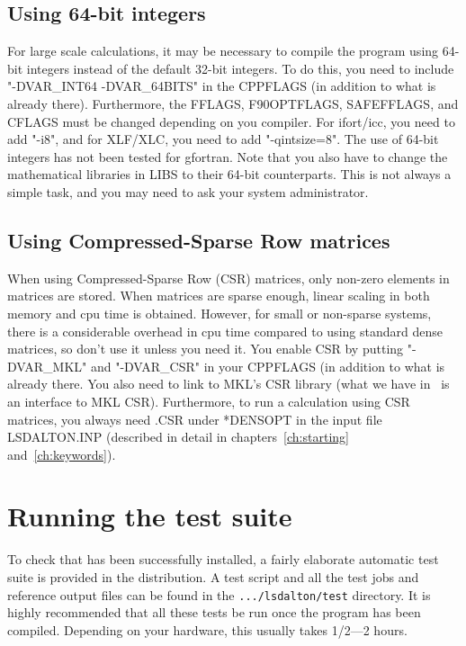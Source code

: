 \subsection{Using 64-bit integers}
For large scale calculations, it may be necessary to compile the program using 64-bit integers instead of the default 32-bit integers.
To do this, you need to include "-DVAR\_INT64 -DVAR\_64BITS" in the CPPFLAGS (in addition to what is already there). Furthermore, 
the FFLAGS, F90OPTFLAGS, SAFEFFLAGS, and CFLAGS must be changed depending on you compiler. For ifort/icc, you need to add "-i8",
and for XLF/XLC, you need to add "-qintsize=8". The use of 64-bit integers has not been tested for gfortran. Note that you also have
to change the mathematical libraries in LIBS to their 64-bit counterparts. This is not always a simple task, and you may need to ask your
system administrator. 

\subsection{Using Compressed-Sparse Row matrices}
When using Compressed-Sparse Row (CSR) matrices, only non-zero elements in matrices are stored. 
When matrices are sparse enough, linear scaling in both memory and cpu time is obtained. However, for
small or non-sparse systems, there is a considerable overhead in cpu time compared to 
using standard dense matrices, so don't use it unless you need it. You enable CSR by putting
"-DVAR\_MKL" and "-DVAR\_CSR" in your CPPFLAGS (in addition to what is already there. You also need to link
to MKL's CSR library (what we have in \lsdalton\ is an interface to MKL CSR). Furthermore, to run a calculation
using CSR matrices, you always need .CSR under *DENSOPT in the input file LSDALTON.INP (described in detail in
chapters~\ref{ch:starting} and~\ref{ch:keywords}).

\section{Running the {\lsdalton} test suite}\label{sec:testsuite}

To check that {\lsdalton} has been successfully installed, a fairly
elaborate automatic test suite is provided in the distribution. A test
script and all the test jobs and reference output files can be found in
the \verb|.../lsdalton/test| directory. It is highly recommended that all
these tests be run once the program has been compiled. Depending on
your hardware, this usually takes 1/2---2 hours.

